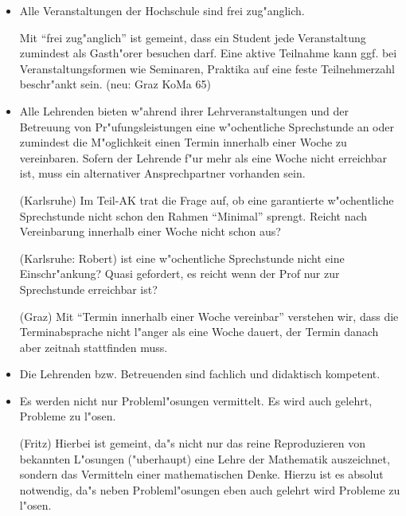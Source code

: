 \begin{itemize}
\item	Alle Veranstaltungen der Hochschule sind frei zug"anglich. 
\begin{kcmt}\begin{komacmt}
	Mit "`frei zug"anglich"' ist gemeint, dass ein Student jede Veranstaltung zumindest als Gasth"orer besuchen darf. Eine aktive Teilnahme kann ggf. bei Veranstaltungsformen wie Seminaren, Praktika auf eine feste Teilnehmerzahl beschr"ankt sein. (neu: Graz KoMa 65)
\end{komacmt}\end{kcmt}

\item	Alle Lehrenden bieten w"ahrend ihrer Lehrveranstaltungen und der Betreuung von Pr"ufungsleistungen eine w"ochentliche Sprechstunde an oder zumindest die M"oglichkeit einen Termin innerhalb einer Woche zu vereinbaren. Sofern der Lehrende f"ur mehr als eine Woche nicht erreichbar ist, muss ein alternativer Ansprechpartner vorhanden sein.

\begin{kcmt}\begin{komacmt}
	(Karlsruhe) Im Teil-AK trat die Frage auf, ob eine garantierte w"ochentliche Sprechstunde
	nicht schon den Rahmen "`Minimal"' sprengt. Reicht nach Vereinbarung
	innerhalb einer Woche nicht schon aus?

	(Karlsruhe: Robert) ist eine w"ochentliche Sprechstunde nicht eine Einschr"ankung?
	Quasi gefordert, es reicht wenn der Prof nur zur Sprechstunde erreichbar ist?

	(Graz) Mit "`Termin innerhalb einer Woche vereinbar"' verstehen wir, dass die Terminabsprache nicht l"anger als eine Woche dauert, der Termin danach aber zeitnah stattfinden muss.
\end{komacmt}\end{kcmt}

\item	Die Lehrenden bzw. Betreuenden sind fachlich und didaktisch kompetent.
	
\item	Es werden nicht nur Probleml"osungen vermittelt. Es wird auch gelehrt, Probleme zu l"osen.

\begin{kcmt}\begin{komacmt}
	(Fritz) Hierbei ist gemeint, da"s nicht nur das reine Reproduzieren von bekannten
	L"osungen ("uberhaupt) eine Lehre der Mathematik auszeichnet, sondern das
	Vermitteln einer mathematischen Denke. Hierzu ist es absolut notwendig,
	da"s neben Probleml"osungen eben auch gelehrt wird Probleme zu l"osen.
\end{komacmt}\end{kcmt}
	

\end{itemize}
